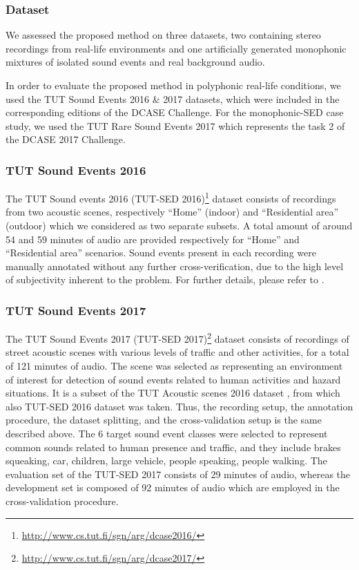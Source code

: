 \subsubsection{Dataset}


We assessed the proposed method on three datasets, two containing stereo recordings from real-life environments and one artificially generated monophonic mixtures of isolated sound events and real background audio.

In order to evaluate the proposed method in polyphonic real-life conditions, we used the TUT Sound Events 2016 \& 2017 datasets, which were included in the corresponding editions of the DCASE Challenge. For the monophonic-SED case study, we used the TUT Rare Sound Events 2017 which represents the task 2 of the DCASE 2017 Challenge.

\subsubsection{TUT Sound Events 2016}
The TUT Sound events 2016 (TUT-SED 2016)\footnote{\url{http://www.cs.tut.fi/sgn/arg/dcase2016/}} dataset consists of recordings from two acoustic scenes, respectively ``Home'' (indoor) and ``Residential area'' (outdoor) which we considered as two separate subsets. 
A total amount of around 54 and 59 minutes of audio are provided respectively for ``Home'' and ``Residential area'' scenarios.
Sound events present in each recording were manually annotated without any further cross-verification, due to the high level of subjectivity inherent to the problem. For further details, please refer to .



\subsubsection{TUT Sound Events 2017}
The TUT Sound Events 2017 (TUT-SED 2017)\footnote{\label{note_dcase17}\url{http://www.cs.tut.fi/sgn/arg/dcase2017/}} dataset consists of recordings of street acoustic scenes with various levels of traffic and other activities, for a total of 121 minutes of audio. The scene was selected as representing an environment of interest for detection of sound events related to human activities and hazard situations. It is a subset of the TUT Acoustic scenes 2016 dataset \cite{mesaros2016tut}, from which also TUT-SED 2016 dataset was taken. Thus, the recording setup, the annotation procedure, the dataset splitting, and the cross-validation setup is the same described above. The 6 target sound event classes were selected to represent common sounds related to human presence and traffic, and they include brakes squeaking, car, children, large vehicle, people speaking, people walking. The evaluation set of the TUT-SED 2017 consists of 29 minutes of audio, whereas the development set is composed of 92 minutes of audio which are employed in the cross-validation procedure.

